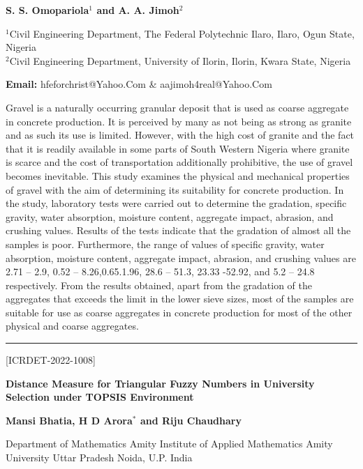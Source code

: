\documentclass[twoside,11pt]{amsart}
\begin{document}
\centerline{\textbf{ S. S. Omopariola$^{1}$ and A. A. Jimoh$^{2}$}}
\vskip 5mm
\begin{flushleft}
$^{1}$Civil Engineering Department, The Federal Polytechnic Ilaro, Ilaro, Ogun State, Nigeria\\
$^{2}$Civil Engineering Department, University of Ilorin, Ilorin, Kwara State, Nigeria
\vskip 5mm
\end{flushleft}
\vskip 2mm
\begin{flushleft}
{\bf Email:} hfeforchrist@Yahoo.Com \& aajimoh4real@Yahoo.Com
\end{flushleft}
\vskip 5mm
Gravel is a naturally occurring granular deposit that is used as coarse aggregate in concrete production. It is perceived by many as not being as strong as granite and as such its use is limited.  However, with the high cost of granite and the fact that it is readily available in some parts of South Western Nigeria where granite is scarce and the cost of transportation additionally prohibitive, the use of gravel becomes inevitable. This study examines the physical and mechanical properties of gravel with the aim of determining its suitability for concrete production. In the study, laboratory tests were carried out to determine the gradation, specific gravity, water absorption, moisture content, aggregate impact, abrasion, and crushing values. Results of the tests indicate that the gradation of almost all the samples is poor. Furthermore, the range of values of specific gravity, water absorption, moisture content, aggregate impact, abrasion, and crushing values are 2.71 – 2.9, 0.52 – 8.26,0.65.1.96, 28.6 – 51.3, 23.33 -52.92, and 5.2 – 24.8 respectively. From the results obtained, apart from the gradation of the aggregates that exceeds the limit in the lower sieve sizes, most of the samples are suitable for use as coarse aggregates in concrete production for most of the other physical and coarse aggregates.
\vskip 2mm
\rule{\textwidth}{0.5pt}
\vskip 5mm
\begin{flushleft}
\centerline{[ICRDET-2022-1008]}
\end{flushleft}
\begin{center}\bf\LARGE
Distance Measure for Triangular Fuzzy Numbers in University Selection under TOPSIS Environment
\end{center}
\vskip 2mm
\newpage
\vskip 2mm
\centerline{\textbf{ Mansi Bhatia, H D Arora$^{*}$ and Riju Chaudhary }}
\vskip 2mm
\begin{flushleft}
Department of Mathematics Amity Institute of Applied Mathematics Amity University Uttar Pradesh Noida, U.P. India
\vskip 5mm
\end{flushleft}
\end{document}
